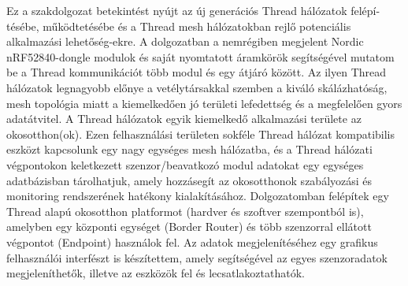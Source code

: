 Ez a szakdolgozat betekintést nyújt az új generációs Thread hálózatok felépí-tésébe, működtetésébe és a Thread mesh hálózatokban rejlő potenciális alkalmazási lehetőség-ekre. A dolgozatban a nemrégiben megjelent Nordic nRF52840-dongle modulok és saját nyomtatott áramkörök segítségével mutatom be a Thread kommunikációt több modul és egy átjáró között. Az ilyen Thread hálózatok legnagyobb előnye a vetélytársakkal szemben a kiváló skálázhatóság, mesh topológia miatt a kiemelkedően jó területi lefedettség és a megfelelően gyors adatátvitel. A Thread hálózatok egyik kiemelkedő alkalmazási területe az okosotthon(ok). Ezen felhasználási területen sokféle Thread hálózat kompatibilis eszközt kapcsolunk egy nagy egységes mesh hálózatba, és a  Thread hálózati végpontokon keletkezett szenzor/beavatkozó modul adatokat egy egységes adatbázisban tárolhatjuk, amely hozzásegít az okosotthonok szabályozási és monitoring rendszerének hatékony kialakításához. Dolgozatomban felépítek egy Thread alapú okosotthon platformot (hardver és szoftver szempontból is), amelyben egy központi egységet (Border Router) és több szenzorral ellátott végpontot (Endpoint) használok fel. Az adatok megjelenítéséhez egy grafikus felhasználói interfészt is készítettem, amely segítségével az egyes szenzoradatok megjeleníthetők, illetve az eszközök fel és lecsatlakoztathatók.